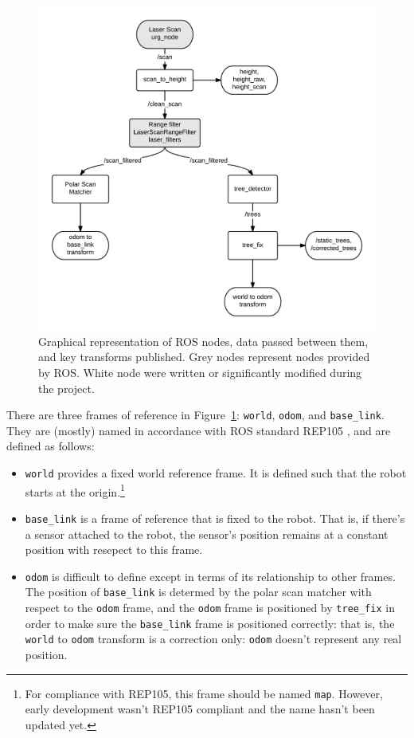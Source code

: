 \documentclass[12pt,oneside,a4paper,draft]{book}
\begin{document}
\begin{figure}[h!]
  \centering
  \includegraphics[width=\textwidth]{figs/roschain}
  \caption{Graphical representation of ROS nodes, data passed between
    them, and key transforms published. Grey nodes represent nodes
    provided by ROS. White node were written or significantly modified
  during the project.}
  \label{fig:roschain}
\end{figure}
\newpage
There are three frames of reference in Figure~\ref{fig:roschain}:
\texttt{world}, \texttt{odom}, and \texttt{base\_link}. They are
(mostly) named in accordance with ROS standard REP105 \cite{rep105},
and are defined as follows:
\begin{itemize}
\item \texttt{world} provides a fixed world reference frame. It is
  defined such that the robot starts at the origin.\footnote{For
    compliance with REP105, this frame should be named
    \texttt{map}. However, early development wasn't REP105 compliant
    and the name hasn't been updated yet.}
\item \texttt{base\_link} is a frame of reference that is fixed to the
  robot. That is, if there's a sensor attached to the robot, the
  sensor's position remains at a constant position with resepect to
  this frame.
\item \texttt{odom} is difficult to define except in terms of its
  relationship to other frames. The position of \texttt{base\_link} is
  determed by the polar scan matcher with respect to the \texttt{odom}
  frame, and the \texttt{odom} frame is positioned by
  \texttt{tree\_fix} in order to make sure the \texttt{base\_link} frame
  is positioned correctly: that is, the \texttt{world} to
  \texttt{odom} transform is a correction only: \texttt{odom} doesn't
  represent any real position.
\end{itemize}
\end{document}

